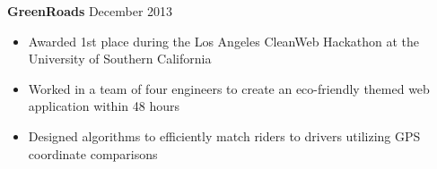 \documentclass{article}
\begin{document}
{\textbf{GreenRoads} \hfill December 2013}
\vspace{-1mm}
\begin{itemize} \itemsep -1pt
	\item Awarded 1st place during the Los Angeles CleanWeb Hackathon at the University of Southern California
	\item Worked in a team of four engineers to create an eco-friendly themed web application within 48 hours
	\item Designed algorithms to efficiently match riders to drivers utilizing GPS coordinate comparisons
\end{itemize}
\end{document}
